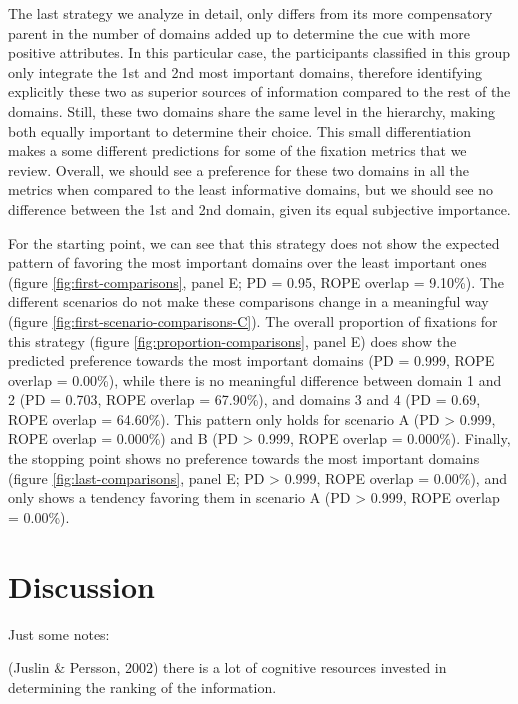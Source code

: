 \documentclass[
  english,
  man]{apa6}
\begin{document}
The last strategy we analyze in detail, only differs from its more compensatory parent in the number of domains added up to determine the cue with more positive attributes. In this particular case, the participants classified in this group only integrate the 1st and 2nd most important domains, therefore identifying explicitly these two as superior sources of information compared to the rest of the domains. Still, these two domains share the same level in the hierarchy, making both equally important to determine their choice. This small differentiation makes a some different predictions for some of the fixation metrics that we review. Overall, we should see a preference for these two domains in all the metrics when compared to the least informative domains, but we should see no difference between the 1st and 2nd domain, given its equal subjective importance.

For the starting point, we can see that this strategy does not show the expected pattern of favoring the most important domains over the least important ones (figure \ref{fig:first-comparisons}, panel E; PD = 0.95, ROPE overlap = 9.10\%). The different scenarios do not make these comparisons change in a meaningful way (figure \ref{fig:first-scenario-comparisons-C}). The overall proportion of fixations for this strategy (figure \ref{fig:proportion-comparisons}, panel E) does show the predicted preference towards the most important domains (PD = 0.999, ROPE overlap = 0.00\%), while there is no meaningful difference between domain 1 and 2 (PD = 0.703, ROPE overlap = 67.90\%), and domains 3 and 4 (PD = 0.69, ROPE overlap = 64.60\%). This pattern only holds for scenario A (PD \textgreater{} 0.999, ROPE overlap = 0.000\%) and B (PD \textgreater{} 0.999, ROPE overlap = 0.000\%). Finally, the stopping point shows no preference towards the most important domains (figure \ref{fig:last-comparisons}, panel E; PD \textgreater{} 0.999, ROPE overlap = 0.00\%), and only shows a tendency favoring them in scenario A (PD \textgreater{} 0.999, ROPE overlap = 0.00\%).

\hypertarget{discussion}{%
\section{Discussion}\label{discussion}}

Just some notes:

(Juslin \& Persson, 2002) there is a lot of cognitive resources invested in determining the ranking of the information.
\end{document}
